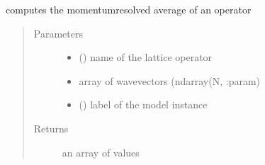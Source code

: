 \documentclass[letterpaper,10pt,english]{sphinxmanual}
\begin{document}
\begin{fulllineitems}
\label{\detokenize{functions:pyqcm.momentum_profile}}
\sphinxAtStartPar
computes the momentum\sphinxhyphen{}resolved average of an operator
\begin{quote}\begin{description}
\item[{Parameters}] \leavevmode\begin{itemize}
\item {} 
\sphinxAtStartPar
{} () \textendash{} name of the lattice operator

\item {} 
\sphinxAtStartPar
{} \textendash{} array of wavevectors (ndarray(N,  :param)

\item {} 
\sphinxAtStartPar
{} () \textendash{} label of the model instance

\end{itemize}

\item[{Returns}] \leavevmode
\sphinxAtStartPar
an array of values

\end{description}\end{quote}

\end{fulllineitems}

\end{document}
